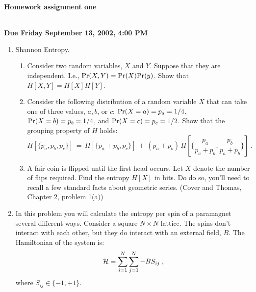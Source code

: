 
\oddsidemargin=0in
\textwidth=6.5in

\renewcommand{\arraystretch}{1.3}



\pagestyle{empty}

\begin{center}
{\large {\bf Homework assignment one}}\\
\end{center}
\bigskip
\hspace{1cm}\\


{\bf Due Friday September 13, 2002, 4:00 PM} \\

\begin{enumerate}

\item Shannon Entropy.
  
\begin{enumerate}
    \item Consider two random variables, $X$ and $Y$.  Suppose
that they are independent.  I.e., ${\rm Pr}(X,Y) = {\rm Pr}(X){\rm
Pr}(y)$.  Show that $H[X,Y] = H[X]H[Y]$. 

    \item Consider the following distribution of a random variable $X$
    that can take one of three values, $a, b$, or $c$:  ${\rm Pr}(X=a)
    = p_a = 1/4$, ${\rm Pr}(X=b) = p_b = 1/4$, and ${\rm Pr}(X=c) =
    p_c = 1/2$.  Show that the grouping property of $H$ holds:
\begin{equation}
   H [ \{ p_a, p_b, p_c\} ] \, = \, H[ \{ p_a + p_b , p_c \}] \,+\,
   (p_a + p_b) \,H \left[ \{ \frac{ p_a}{p_a + p_b} , \frac{ p_b}{p_a
   + p_b} \} \right] \;.   
\end{equation}

    \item A fair coin is flipped until the first head occurs.  Let $X$
denote the number of flips required.  Find the entropy $H[X]$ in
bits.  Do do so, you'll need to recall a few standard facts about
geometric series.  (Cover and Thomas, Chapter 2, problem 1(a))


\end{enumerate}

\item  In this problem you will calculate the entropy per spin of a
paramagnet several different ways.  Consider a square $N \times N$
lattice.  The spins don't interact with each other, but they do
interact with an external field, $B$.  The Hamiltonian of the system
is:
\begin{equation}
 {\cal H} = \sum_{i=1}^N \sum_{j=1}^N -BS_{ij} \;,
\end{equation}
where $S_{ij} \in \{-1,+1\}$. 
\begin{enumerate}


\end{enumerate}
\end{enumerate}
